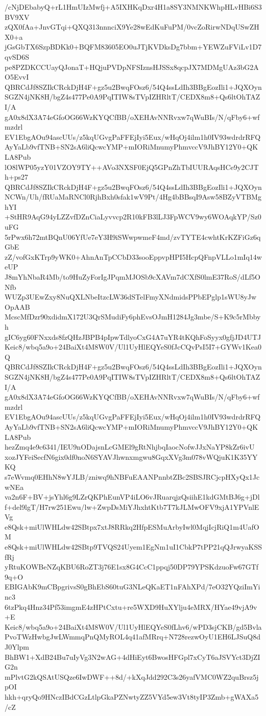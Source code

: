 /cNjDEbabyQ+rL1HmUIzMwfj+A5IXHKqDxr4H1a8SY3NMNKWhpHLvHBi6S3BV9XV
zQX0fAa+JnvGTqi+QXQ313nnnciX9Ye28wEdKuFuPM/0vcZoRirwNDqUSwZHX0+a
jGsGbTX6SzpBDKk0+BQFM83605EO0uJTjKVDksDg7bbm+YEWZuFViLv1D7qvSD6S
pe8PZDKCCUayQJonaT+HQjuPVDpNFSIznsHJSSx8qcpJX7MDMgUAz3bG2AO5EvvI
QBRCdJf8SZIkCRckDjH4F+gz5u2BwqFOsz6/54Q4ssLdIh3BBgEozIli1+JQXOyn
SGZN4jNK8H/bgZ4s477Pe0A9PqITIW8sTVpIZHRltT/CEDX8m8+Qs6ltOhTAZI/A
gA0x8dX3A74eGfoOG66WzKYQCfBB/oXEHAvNNRvxw7qWuBIs/N/qFby6+wfmzdrl
EV1EbgAOu94ascUUs/z5kqUGvgPaFFEjIyi5Eux/wHqOj4ilm1h0IV93wdrdrRFQ
AyYaLb9vfTNB+SN2sA6liQcwcYMP+mIORiMnumyPhmvccV9JhBY12Y0+QKLA8Pub
lO8lWP05yzY01VZOY9TY++AVo3NXSF0EjQ5GPnZhTbIUURAqsHCe9y2CJTh+ps27
QBRCdJf8SZIkCRckDjH4F+gz5u2BwqFOsz6/54Q4ssLdIh3BBgEozIli1+JQXOyn
NCWn/Uh/fRUaMaRNCl0RjhBxh0sfak1wV9Pt/4Hg4bBBsqI9Asw58BZyVTBMghYI
+StHR9AqG94yLZZvfDZnCiaLyvvcp2R10kFB3lLJ3FpWCV9wy6WOAqkYP/Sz0uFG
5rPwx6h72mtBQnU06YfUe7eY3H9iSWwpwmeF4md/zvTYTE4cwhtKrKZFiGz6qGbE
zZ/vofGxKTrp9yWK0+AhnAnTpCCbD33sooEppvpHPI5HcpQFnpVLLo1mIq14weUP
J8mYhNbaR4Mb/to9HuZyForIgJPqmMJOSb9cXAVm7dCXfS0lmE37RoS/dLf5ONfb
WUZp3UEwZxy8NuQXLNbeItzcLW36dSTelFmyXNdmidsPPbEPglp1sWU8yJwOpAAB
McscMfDzr90xdidmX172U3QrSMudiFy6phEvsOJmH1284Jg3mbe/S+K9c5rMbbyh
gIC6yg60FNxxds8fzQHzJBPB4pIpwTdlyoCxG4A7uYR4tKQhFoSyyx0gfjJD4UTJ
Keic8/wbq5a9o+24BaiXt4M8W0V/Ul1UyHlEQYeS0fJcCQvPsI5I7+GYWv1Kea0Q
QBRCdJf8SZIkCRckDjH4F+gz5u2BwqFOsz6/54Q4ssLdIh3BBgEozIli1+JQXOyn
SGZN4jNK8H/bgZ4s477Pe0A9PqITIW8sTVpIZHRltT/CEDX8m8+Qs6ltOhTAZI/A
gA0x8dX3A74eGfoOG66WzKYQCfBB/oXEHAvNNRvxw7qWuBIs/N/qFby6+wfmzdrl
EV1EbgAOu94ascUUs/z5kqUGvgPaFFEjIyi5Eux/wHqOj4ilm1h0IV93wdrdrRFQ
AyYaLb9vfTNB+SN2sA6liQcwcYMP+mIORiMnumyPhmvccV9JhBY12Y0+QKLA8Pub
hezZmq4e9c6341/IEU9nODajsnLcGMEl9gRtNhjbqIaocNofwJJxNaYP8kZr6ivU
xozJYFeiSecfN6gix0df0noN6SYAVJhwnxmgwu8GqxXVg3m078vWQjuK1K35YYKQ
s7eWvmq0EHhN8wYJLB/zniwq9hNBFuEAANPnnbtZBc2SBSJRCjcpHXyQx1JcwNEa
va2n6F+BV+jsYhl6g9LZrQKPhEunVP4iLO6vJRuarqjzQsiihE1kdGMtBJ6g+jDl
f+del9lgT/H7rw251Ewu/lw+ZwpDsMiYJhxhtKtb7T7kJLMwOFV9xjA1YPVnlEVg
e8Qsk+miUlWHLdw42SBtpx7xtJ8RRkq2HfpESMuArbyIwl0MqjIcjRiQ1m4UafOM
e8Qsk+miUlWHLdw42SBtp9TVQS24Uyem1EgNm1uI1CbkP7tPP21qQJrwyaKSSfRj
yRtuKOWBeNZqKBU6RoZT3j76E1sx8G4CcC1ppqj50DP79YPSKdzuoFw67GTf9q+O
EBIGAbK9mCBpgrivsS0gBhEbS60tuG3NLeQKaET1nFAhXPd/7eO32YQziImYinc3
6tzPkq4Hnz34Pf53imgmE4zHPtCxtu+re5WXD9HuXYlju4eMRX/HYae49vjA9v+E
Keic8/wbq5a9o+24BaiXt4M8W0V/Ul1UyHlEQYeS0fLhv6/wPD3sjCKB/gd5Bvla
PvoTWzHwbgJwLWmmqPnQMyROL4q41afMRrq+N728rezwOyU1EH6LJSuQ8dJ0Ylpm
BhBW1+XdB24Bu7uIyVg3N2wAG+4dHiEyt6BwosHFGpl7xCyT6aJSVYct3DjZIG2n
mPlvtG2kQSAtUSQze6IwDWF++8d/+kXqJdd292C3s26yafVMC0WZ2quBrsz5jpOI
hkh+qryQo9HNczIBdCGzLtlpGkaPZNwtyZZ5VYd5ew3Vt8tyIP3Zmb+gWAXa5/cZ
